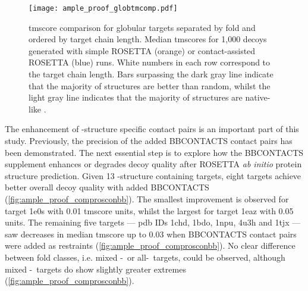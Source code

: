 \begin{figure}[H]
    \centering
    \texttt{[image: ample\_proof\_globtmcomp.pdf]}
    \caption[TM-score comparison for globular targets separated by fold]{\gls{tmscore} comparison for globular targets separated by fold and ordered by target chain length. Median \gls{tmscore}s for 1,000 decoys generated with simple ROSETTA (orange) or contact-assisted ROSETTA (blue) runs. White numbers in each row correspond to the target chain length. Bars surpassing the dark gray line indicate that the majority of structures are better than random, whilst the light gray line indicates that the majority of structures are native-like \cite{Xu2010-kr}.}
    \label{fig:ample_proof_globtmcomp}
\end{figure}

The enhancement of \textbeta-structure specific contact pairs is an important part of this study. Previously, the precision of the added BBCONTACTS contact pairs has been demonstrated. The next essential step is to explore how the BBCONTACTS supplement enhances or degrades decoy quality after ROSETTA \textit{ab initio} protein structure prediction. Given 13 \textbeta-structure containing targets, eight targets achieve better overall decoy quality with added BBCONTACTS (\cref{fig:ample_proof_comprosconbb}). The smallest improvement is observed for target 1e0s with 0.01 \gls{tmscore} units, whilst the largest for target 1eaz with 0.05 units. The remaining five targets --- \gls{pdb} IDs 1chd, 1bdo, 1npu, 4u3h and 1tjx --- saw decreases in median \gls{tmscore} up to 0.03 when BBCONTACTS contact pairs were added as restraints (\cref{fig:ample_proof_comprosconbb}). No clear difference between fold classes, i.e. mixed \textalpha-\textbeta\ or all-\textbeta\ targets, could be observed, although mixed \textalpha-\textbeta\ targets do show slightly greater extremes (\cref{fig:ample_proof_comprosconbb}).

